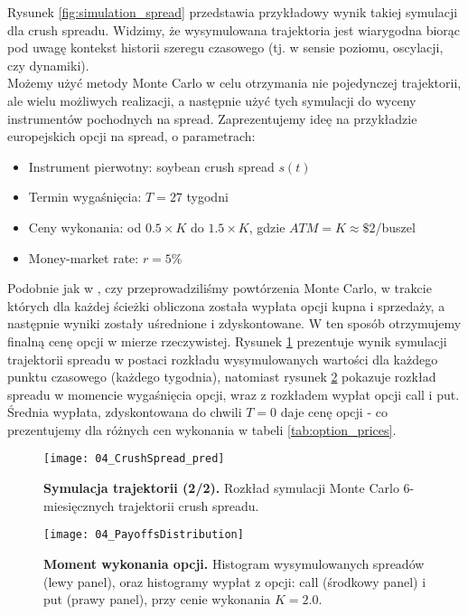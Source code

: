 Rysunek \ref{fig:simulation_spread} przedstawia przykładowy wynik takiej symulacji dla crush spreadu. Widzimy, że wysymulowana trajektoria jest wiarygodna biorąc pod uwagę kontekst historii szeregu czasowego (tj. w sensie poziomu, oscylacji, czy dynamiki).\\

Możemy użyć metody Monte Carlo w celu otrzymania nie pojedynczej trajektorii, ale wielu możliwych realizacji, a następnie użyć tych symulacji do wyceny instrumentów pochodnych na spread. Zaprezentujemy ideę na przykładzie europejskich opcji na spread, o parametrach:
\begin{itemize}
	\item Instrument pierwotny: soybean crush spread $s(t)$
	\item Termin wygaśnięcia: $T = 27$ tygodni
	\item Ceny wykonania: od $0.5\times K$ do $1.5\times K$, gdzie $ATM = K \approx\$2$/buszel
	\item Money-market rate: $r = 5\%$
\end{itemize}

Podobnie jak w \cite{Bernard_Pricing_Multivariate_Options_with_copulae}, czy  \cite{Herath_Copula_Crack_Spread} przeprowadziliśmy powtórzenia Monte Carlo, w trakcie których dla każdej ścieżki obliczona została wypłata opcji kupna i sprzedaży, a następnie wyniki zostały uśrednione i zdyskontowane. W ten sposób otrzymujemy finalną cenę opcji w mierze rzeczywistej. 
Rysunek \ref{fig:simulation_monte_carlo} prezentuje wynik symulacji trajektorii spreadu w postaci rozkładu wysymulowanych wartości dla każdego punktu czasowego (każdego tygodnia), natomiast rysunek \ref{fig:payoffs_distribution} pokazuje rozkład spreadu w momencie wygaśnięcia opcji, wraz z rozkładem wypłat opcji call i put. Średnia wypłata, zdyskontowana do chwili $T=0$ daje cenę opcji - co prezentujemy dla różnych cen wykonania w tabeli \ref{tab:option_prices}.\\
\begin{figure}[h]
	\centering
	\texttt{[image: 04\_CrushSpread\_pred]}
	\caption{\textbf{Symulacja trajektorii (2/2).} Rozkład symulacji Monte Carlo $6$-miesięcznych trajektorii crush spreadu. \label{fig:simulation_monte_carlo}}
\end{figure}


\begin{figure}[h]
	\centering
	\texttt{[image: 04\_PayoffsDistribution]}
	\caption{\textbf{Moment wykonania opcji.} Histogram wysymulowanych spreadów (lewy panel), oraz histogramy wypłat z opcji: call (środkowy panel) i put (prawy panel), przy cenie wykonania $K=2.0$. \label{fig:payoffs_distribution}}
\end{figure}


